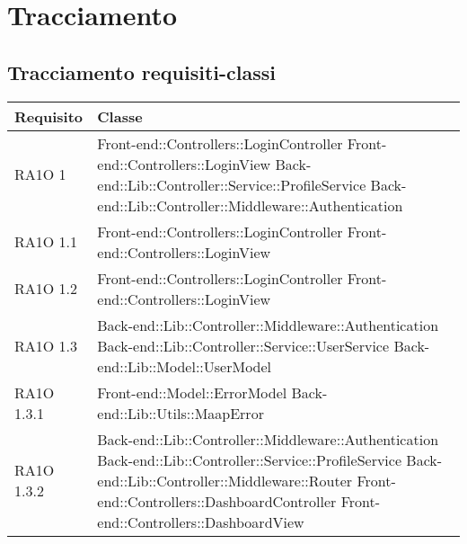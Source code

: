 \section{Tracciamento}
\subsection{Tracciamento requisiti-classi}

\begin{center}
      \bgroup
      \def\arraystretch{1.8}
      \begin{longtable}{ | p{3cm} | p{11cm} | }
    \hline
    
      \cellcolor[gray]{0.9} \textbf{Requisito} & \cellcolor[gray]{0.9} \textbf{Classe} \\ \hline
      
	RA1O 1 & Front-end::Controllers::LoginController \newline Front-end::Controllers::LoginView \newline 
			Back-end::Lib::Controller::Service::ProfileService \newline
			Back-end::Lib::Controller::Middleware::Authentication\\ \hline 
			
	RA1O 1.1 & Front-end::Controllers::LoginController \newline Front-end::Controllers::LoginView \\ \hline 
	RA1O 1.2 & Front-end::Controllers::LoginController \newline Front-end::Controllers::LoginView \\ \hline      

	RA1O 1.3 & Back-end::Lib::Controller::Middleware::Authentication  \newline 
			Back-end::Lib::Controller::Service::UserService \newline 
			Back-end::Lib::Model::UserModel  \newline \\ \hline  
    
    RA1O 1.3.1 & Front-end::Model::ErrorModel \newline Back-end::Lib::Utils::MaapError  \newline \\ \hline 
           
    RA1O 1.3.2 & Back-end::Lib::Controller::Middleware::Authentication \newline
        			Back-end::Lib::Controller::Service::ProfileService \newline
        			Back-end::Lib::Controller::Middleware::Router \newline
        			Front-end::Controllers::DashboardController \newline
        			Front-end::Controllers::DashboardView  \newline  \\ \hline 
        				

\end{longtable}
\end{center}
